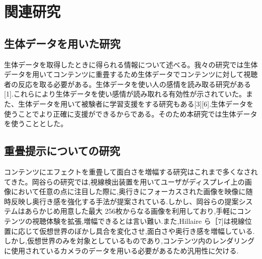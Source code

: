 \thispagestyle{myheadings}
\chapter{関連研究}


\section{生体データを用いた研究}
生体データを取得したときに得られる情報について述べる。我々の研究では生体データを用いてコンテンツに重畳するため生体データでコンテンツに対して視聴者の反応を取る必要がある。生体データを使い人の感情を読み取る研究がある[1].これらにより生体データを使い感情が読み取れる有効性が示されていた。また、生体データを用いて被験者に学習支援をする研究もある[3][6].生体データを使うことでより正確に支援ができるからである。そのため本研究では生体データを使うこととした。


\section{重畳提示についての研究}
コンテンツにエフェクトを重畳して面白さを増幅する研究はこれまで多くなされてきた。岡谷ら\cite{effects01}の研究では,視線検出装置を用いてユーザがディスプレイ上の画像において任意の点に注目した際に,奥行きにフォーカスされた画像を映像に随時反映し奥行き感を強化する手法が提案されている.しかし、岡谷らの提案システムはあらかじめ用意した最大 256枚からなる画像を利用しており,手軽にコンテンツの視聴体験を拡張,増幅できるとは言い難い.また,Hillaire ら［7]は視線位置に応じて仮想世界のぼかし具合を変化させ,面白さや奥行き感を増幅している.しかし,仮想世界のみを対象としているものであり,コンテンツ内のレンダリングに使用されているカメラのデータを用いる必要があるため汎用性に欠ける.


